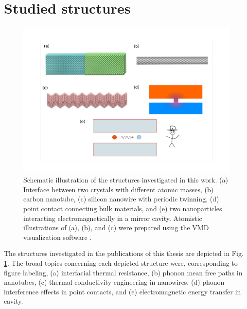  \cite{dhar03,roy07,jacquet09}  

\section{Studied structures}

\begin{figure}
\begin{center}
 \includegraphics[width=1\columnwidth]{inkscape/systems.pdf} 
 \caption{Schematic illustration of the structures investigated in this work. (a) Interface between two crystals with different atomic masses, (b) carbon nanotube, (c) silicon nanowire with periodic twinning, (d) point contact connecting bulk materials, and (e) two nanoparticles interacting electromagnetically in a mirror cavity. Atomistic illustrations of (a), (b), and (c) were prepared using the VMD visualization software \cite{humphrey96}.}
\label{fig:intro_structures}
\end{center}
\end{figure}

The structures investigated in the publications of this thesis are depicted in Fig. \ref{fig:intro_structures}. The broad topics concerning each depicted structure were, corresponding to figure labeling, (a) interfacial thermal resistance, (b) phonon mean free paths in nanotubes, (c) thermal conductivity engineering in nanowires, (d) phonon interference effects in point contacts, and (e) electromagnetic energy transfer in cavity. 

